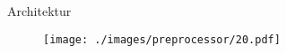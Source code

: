 \begin{frame}{Architektur}
    \begin{figure}
    	\centering
    	\texttt{[image: ./images/preprocessor/20.pdf]}
    \end{figure}
\end{frame}

